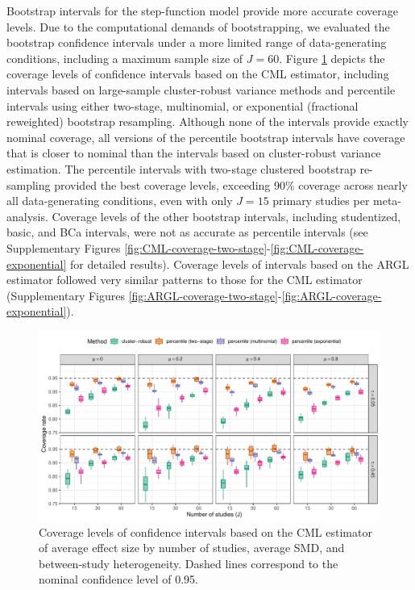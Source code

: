 \documentclass[
  american,
  man, donotrepeattitle,floatsintext]{apa7}
\begin{document}
Bootstrap intervals for the step-function model provide more accurate coverage levels.
Due to the computational demands of bootstrapping, we evaluated the bootstrap confidence intervals under a more limited range of data-generating conditions, including a maximum sample size of \(J = 60\).
Figure \ref{fig:CML-coverage} depicts the coverage levels of confidence intervals based on the CML estimator, including intervals based on large-sample cluster-robust variance methods and percentile intervals using either two-stage, multinomial, or exponential (fractional reweighted) bootstrap resampling.
Although none of the intervals provide exactly nominal coverage, all versions of the percentile bootstrap intervals have coverage that is closer to nominal than the intervals based on cluster-robust variance estimation.
The percentile intervals with two-stage clustered bootstrap re-sampling provided the best coverage levels, exceeding 90\% coverage across nearly all data-generating conditions, even with only \(J = 15\) primary studies per meta-analysis.
Coverage levels of the other bootstrap intervals, including studentized, basic, and BCa intervals, were not as accurate as percentile intervals (see Supplementary Figures \ref{fig:CML-coverage-two-stage}-\ref{fig:CML-coverage-exponential} for detailed results).
Coverage levels of intervals based on the ARGL estimator followed very similar patterns to those for the CML estimator (Supplementary Figures \ref{fig:ARGL-coverage-two-stage}-\ref{fig:ARGL-coverage-exponential}).

\begin{figure}
\includegraphics{step-function-selection-models-with-dependent-effects_files/figure-latex/CML-coverage-1} \caption{Coverage levels of confidence intervals based on the CML estimator of average effect size by number of studies, average SMD, and between-study heterogeneity. Dashed lines correspond to the nominal confidence level of 0.95.}\label{fig:CML-coverage}
\end{figure}
\end{document}
